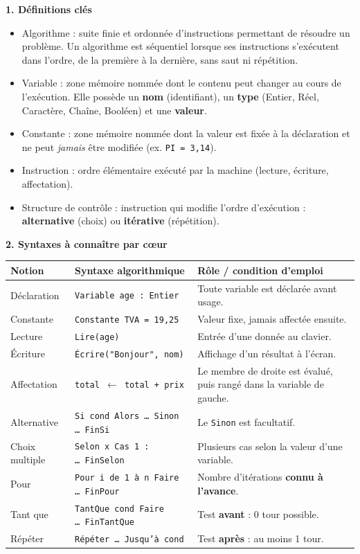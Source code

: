 \documentclass[11pt]{article}
\newcommand{\cle}[1]{{\popxbold\color{popdark}#1}}
\begin{document}
\begin{bilan}
\textbf{1. Définitions clés}
\begin{itemize}
  \item \cle{Algorithme} : suite finie et ordonnée d'\cle{instructions} permettant de résoudre un problème. Un algorithme est \cle{séquentiel} lorsque ses instructions s'exécutent dans l'ordre, de la première à la dernière, sans saut ni répétition.
  \item \cle{Variable} : zone mémoire nommée dont le contenu peut changer au cours de l'exécution. Elle possède un \textbf{nom} (identifiant), un \textbf{type} (Entier, Réel, Caractère, Chaîne, Booléen) et une \textbf{valeur}.
  \item \cle{Constante} : zone mémoire nommée dont la valeur est fixée à la déclaration et ne peut \emph{jamais} être modifiée (ex. \texttt{PI = 3,14}).
  \item \cle{Instruction} : ordre élémentaire exécuté par la machine (lecture, écriture, affectation).
  \item \cle{Structure de contrôle} : instruction qui modifie l'ordre d'exécution : \textbf{alternative} (choix) ou \textbf{itérative} (répétition).
\end{itemize}

\textbf{2. Syntaxes à connaître par c\oe ur}
\begin{center}
\begin{tabularx}{\linewidth}{|l|X|X|}
\hline
\rowcolor{popblueL} \textbf{Notion} & \textbf{Syntaxe algorithmique} & \textbf{Rôle / condition d'emploi} \\
\hline
Déclaration & \texttt{Variable age : Entier} & Toute variable est déclarée avant usage. \\
\hline
Constante & \texttt{Constante TVA = 19,25} & Valeur fixe, jamais affectée ensuite. \\
\hline
Lecture & \texttt{Lire(age)} & Entrée d'une donnée au clavier. \\
\hline
Écriture & \texttt{Écrire("Bonjour", nom)} & Affichage d'un résultat à l'écran. \\
\hline
Affectation & \texttt{total $\leftarrow$ total + prix} & Le membre de droite est évalué, puis rangé dans la variable de gauche. \\
\hline
Alternative & \texttt{Si cond Alors \dots\ Sinon \dots\ FinSi} & Le \texttt{Sinon} est facultatif. \\
\hline
Choix multiple & \texttt{Selon x Cas 1 : \dots\ FinSelon} & Plusieurs cas selon la valeur d'une variable. \\
\hline
Pour & \texttt{Pour i de 1 à n Faire \dots\ FinPour} & Nombre d'itérations \textbf{connu à l'avance}. \\
\hline
Tant que & \texttt{TantQue cond Faire \dots\ FinTantQue} & Test \textbf{avant} : 0 tour possible. \\
\hline
Répéter & \texttt{Répéter \dots\ Jusqu'à cond} & Test \textbf{après} : au moins 1 tour. \\
\hline
\end{tabularx}
\end{center}


\end{bilan}
\end{document}
